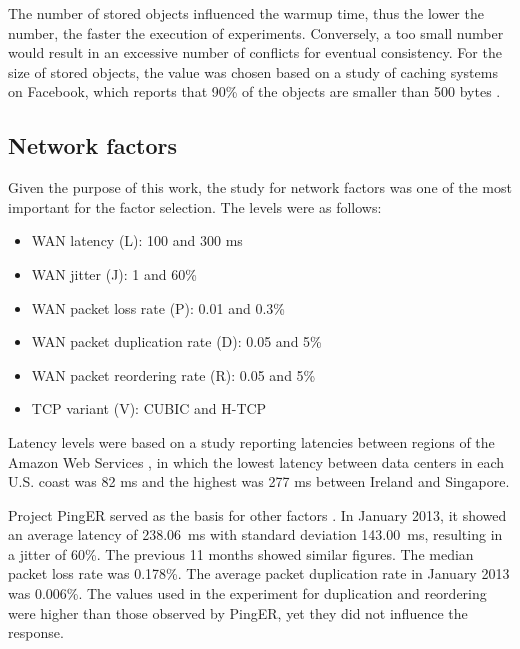 \documentclass[doublespacing]{bmcart}
\begin{document}
The number of stored objects influenced the warmup time, thus the lower the
number, the faster the execution of experiments. Conversely, a too small number
would result in an excessive number of conflicts for eventual consistency. For
the size of stored objects, the value was chosen based on a study of caching
systems on Facebook, which reports that 90\% of the objects are smaller than
500 bytes \cite{Atikoglu2012}.

\subsection{Network factors}

Given the purpose of this work, the study for network factors was one of the
most important for the factor selection. The levels were as follows:

\begin{itemize}

\item WAN latency (L): 100 and 300 ms

\item WAN jitter (J): 1 and 60\%

\item WAN packet loss rate (P): 0.01 and 0.3\%

\item WAN packet duplication rate (D): 0.05 and 5\%

\item WAN packet reordering rate (R): 0.05 and 5\%

\item TCP variant (V): CUBIC and H-TCP

\end{itemize}

Latency levels were based on a study reporting latencies between regions of the
Amazon Web Services \cite{Sovran2011}, in which the lowest latency between data
centers in each U.S. coast was 82 ms and the highest was 277 ms between Ireland
and Singapore.

Project PingER served as the basis for other factors \cite{PingER2013}. In
January 2013, it showed an average latency of 238.06~ms with standard deviation
143.00~ms, resulting in a jitter of 60\%. The previous 11 months showed similar
figures. The median packet loss rate was 0.178\%. The average packet
duplication rate in January 2013 was 0.006\%. The values used in the experiment
for duplication and reordering were higher than those observed by PingER, yet
they did not influence the response.
\end{document}
